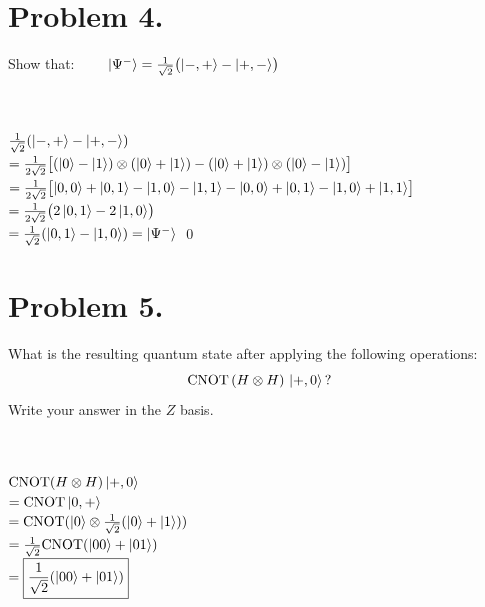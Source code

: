 \documentclass[12pt]{exam}
\begin{document}
\section{Problem 4.}
Show that: $\qquad \ket{\Psi^-}=\frac{1}{\sqrt{2}}\bigl(\ket{-,+}-\ket{+,-}\bigr)$
\begin{solution}\\\\
$\frac{1}{\sqrt{2}} (\ket{-,+} - \ket{+,-})$ \\

$= \frac{1}{2\sqrt{2}} \bigl[(\ket{0} - \ket{1}) \otimes (\ket{0} + \ket{1}) - (\ket{0} + \ket{1}) \otimes (\ket{0} - \ket{1})\bigr]$ \\

$= \frac{1}{2\sqrt{2}} \bigl[\ket{0,0} + \ket{0,1} - \ket{1,0} - \ket{1,1} - \ket{0,0} + \ket{0,1} - \ket{1,0} + \ket{1,1}\bigr]$ \\

$= \frac{1}{2\sqrt{2}} \bigl(2\ket{0,1} - 2 \ket{1,0}\bigr)$ \\

$= \frac{1}{\sqrt{2}} (\ket{0,1} - \ket{1,0}) = \ket{\Psi^-}$ \qed
\end{solution}


\section{Problem 5.}
What is the resulting quantum state after applying the following operations:
$$\mathrm{CNOT}\,(H\otimes H)\,\ket{+,0}\,?$$
Write your answer in the $Z$ basis.
\begin{solution}\\\\
$\mathrm{CNOT} (H \otimes H) \ket{+, 0}$\\

$ = \mathrm{CNOT} \ket{0, +}$\\

$ = \mathrm{CNOT} (\ket{0} \otimes \frac{1}{\sqrt{2}}(\ket{0} + \ket{1}))$\\

$ = \frac{1}{\sqrt{2}} \mathrm{CNOT} (\ket{00} + \ket{01})$\\

$ = \boxed{\frac{1}{\sqrt{2}} (\ket{00} + \ket{01})}$
\end{solution}
\end{document}
